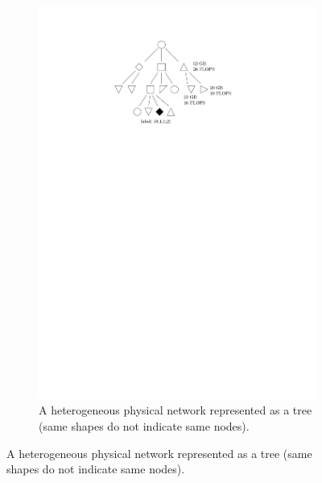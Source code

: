 \documentclass[a4paper,10pt]{article}
\begin{document}
\begin{figure}
 \begin{subfigure}{\textwidth}
	\centering
	\includegraphics[scale=1]{heterog_tree}
	\caption{A heterogeneous physical network represented as a tree (same shapes do not indicate
	same nodes).}
	\label{fig:heterog_tree}
 \end{subfigure}	
 

\end{figure}
\end{document}
